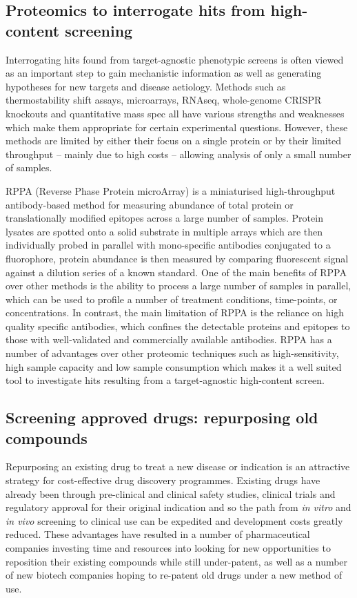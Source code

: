 \documentclass[a4paper,11pt,twoside,openright]{scrbook}
\begin{document}
\subsection{Proteomics to interrogate hits from high-content screening}
Interrogating hits found from target-agnostic phenotypic screens is often viewed as an important step to gain 
mechanistic information as well as generating hypotheses for new targets and disease aetiology.
Methods such as thermostability shift assays, microarrays, RNAseq, whole-genome CRISPR knockouts and quantitative mass 
spec all have various strengths and weaknesses which make them appropriate for certain experimental questions.
However, these methods are limited by either their focus on a single protein or by their limited throughput -- mainly 
due to high costs -- allowing analysis of only a small number of samples.

RPPA (Reverse Phase Protein microArray) is a miniaturised high-throughput antibody-based method for measuring abundance 
of total protein or translationally modified epitopes across a large number of samples.
Protein lysates are spotted onto a solid substrate in multiple arrays which are then individually probed in parallel 
with mono-specific antibodies conjugated to a fluorophore, protein abundance is then measured by comparing fluorescent 
signal against a dilution series of a known standard. \cite{Akbani2014}
One of the main benefits of RPPA over other methods is the ability to process a large number of samples in parallel, 
which can be used to profile a number of treatment conditions, time-points, or concentrations.
In contrast, the main limitation of RPPA is the reliance on high quality specific antibodies, which confines the 
detectable proteins and epitopes to those with well-validated and commercially available antibodies.
RPPA has a number of advantages over other proteomic techniques such as high-sensitivity, high sample capacity and low 
sample consumption which makes it a well suited tool to investigate hits resulting from a target-agnostic high-content 
screen.


\subsection{Screening approved drugs: repurposing old compounds}

Repurposing an existing drug to treat a new disease or indication is an attractive strategy for cost-effective drug 
discovery programmes.
Existing drugs have already been through pre-clinical and clinical safety studies, clinical trials and regulatory 
approval for their original indication and so the path from \textit{in vitro} and \textit{in vivo} screening to 
clinical use can be expedited and development costs greatly reduced.
These advantages have resulted in a number of pharmaceutical companies investing time and resources into looking for 
new opportunities to reposition their existing compounds while still under-patent, as well as a number of new biotech 
companies hoping to re-patent old drugs under a new method of use.
\end{document}
